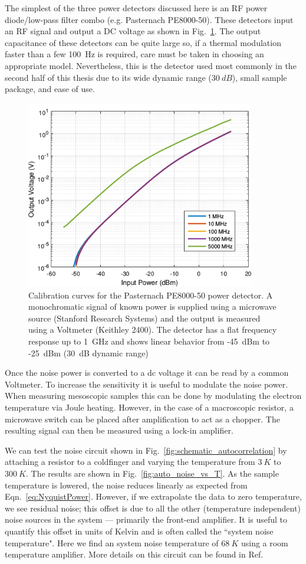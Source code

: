 The simplest of the three power detectors discussed here is an RF power diode/low-pass filter combo (e.g. Pasternach PE8000-50). These detectors input an RF signal and output a DC voltage as shown in Fig.~\ref{fig:PE8000}. The output capacitance of these detectors can be quite large so, if a thermal modulation faster than a few 100~Hz is required, care must be taken in choosing an appropriate model. Nevertheless, this is the detector used most commonly in the second half of this thesis due to its wide dynamic range ($30~dB$), small sample package, and ease of use.

\begin{figure}
\centering
\includegraphics[width = 100mm]{figures/Johnson_noise_thermometry/PE8000-50.png}
\caption{Calibration curves for the Pasternach PE8000-50 power detector. A monochromatic signal of known power is supplied using a microwave source (Stanford Research Systems) and the output is measured using a Voltmeter (Keithley 2400). The detector has a flat frequency response up to 1~GHz and shows linear behavior from -45~dBm to -25~dBm (30~dB dynamic range)}
\label{fig:PE8000}
\end{figure}

Once the noise power is converted to a dc voltage it can be read by a common Voltmeter. To increase the sensitivity it is useful to modulate the noise power. When measuring mesoscopic samples this can be done by modulating the electron temperature via Joule heating. However, in the case of a macroscopic resistor, a microwave switch can be placed after amplification to act as a chopper. The resulting signal can then be measured using a lock-in amplifier.

We can test the noise circuit shown in Fig.~\ref{fig:schematic_autocorrelation} by attaching a resistor to a coldfinger and varying the temperature from $3~K$ to $300~K$. The results are shown in Fig.~\ref{fig:auto_noise_vs_T}. As the sample temperature is lowered, the noise reduces linearly as expected from Eqn.~\ref{eq:NyquistPower}. However, if we extrapolate the data to zero temperature, we see residual noise; this offset is due to all the other (temperature independent) noise sources in the system --- primarily the front-end amplifier. It is useful to quantify this offset in units of Kelvin and is often called the ``system noise temperature". Here we find an system noise temperature of $68~K$ using a room temperature amplifier.
More details on this circuit can be found in Ref.~\cite{crossno_development_2015}

